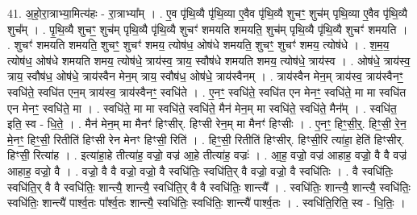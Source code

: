 \documentclass[17pt]{extarticle}
\begin{document}
41. अ॒हो॒रा॒त्राभ्या॒मित्य॑हः - रा॒त्राभ्या᳚म् । . ए॒व पृ॑थि॒व्यै पृ॑थि॒व्या ए॒वैव पृ॑थि॒व्यै शुचꣳ॒॒ शुच॑म् पृथि॒व्या ए॒वैव पृ॑थि॒व्यै शुच᳚म् । . पृ॒थि॒व्यै शुचꣳ॒॒ शुच॑म् पृथि॒व्यै पृ॑थि॒व्यै शुचꣳ॑ शमयति शमयति॒ शुच॑म् पृथि॒व्यै पृ॑थि॒व्यै शुचꣳ॑ शमयति । . शुचꣳ॑ शमयति शमयति॒ शुचꣳ॒॒ शुचꣳ॑ शमय॒ त्योष॑ध॒ ओष॑धे शमयति॒ शुचꣳ॒॒ शुचꣳ॑ शमय॒ त्योष॑धे । . श॒म॒य॒ त्योष॑ध॒ ओष॑धे शमयति शमय॒ त्योष॑धे॒ त्राय॑स्व॒ त्राय॒ स्वौष॑धे शमयति शमय॒ त्योष॑धे॒ त्राय॑स्व । . ओष॑धे॒ त्राय॑स्व॒ त्राय॒ स्वौष॑ध॒ ओष॑धे॒ त्राय॑स्वैन मेन॒म् त्राय॒ स्वौष॑ध॒ ओष॑धे॒ त्राय॑स्वैनम् । . त्राय॑स्वैन मेन॒म् त्राय॑स्व॒ त्राय॑स्वैनꣳ॒॒ स्वधि॑ते॒ स्वधि॑त एन॒म् त्राय॑स्व॒ त्राय॑स्वैनꣳ॒॒ स्वधि॑ते । . ए॒नꣳ॒॒ स्वधि॑ते॒ स्वधि॑त एन मेनꣳ॒॒ स्वधि॑ते॒ मा मा स्वधि॑त एन मेनꣳ॒॒ स्वधि॑ते॒ मा । . स्वधि॑ते॒ मा मा स्वधि॑ते॒ स्वधि॑ते॒ मैन॑ मेन॒म् मा स्वधि॑ते॒ स्वधि॑ते॒ मैन᳚म् । . स्वधि॑त॒ इति॒ स्व - धि॒ते॒ । . मैन॑ मेन॒म् मा मैनꣳ॑ हिꣳसीर्. हिꣳसी रेन॒म् मा मैनꣳ॑ हिꣳसीः । . ए॒नꣳ॒॒ हिꣳ॒॒सी॒र्॒. हिꣳ॒॒सी॒ रे॒न॒ मे॒नꣳ॒॒ हिꣳ॒॒सी॒ रितीति॑ हिꣳसी रेन मेनꣳ हिꣳसी॒ रिति॑ । . हिꣳ॒॒सी॒ रितीति॑ हिꣳसीर्. हिꣳसी॒रि त्या॑हा॒ हेति॑ हिꣳसीर्. हिꣳसी॒ रित्या॑ह । . इत्या॑हा॒हे तीत्या॑ह॒ वज्रो॒ वज्र॑ आ॒हे तीत्या॑ह॒ वज्रः॑ । . आ॒ह॒ वज्रो॒ वज्र॑ आहाह॒ वज्रो॒ वै वै वज्र॑ आहाह॒ वज्रो॒ वै । . वज्रो॒ वै वै वज्रो॒ वज्रो॒ वै स्वधि॑तिः॒ स्वधि॑ति॒र् वै वज्रो॒ वज्रो॒ वै स्वधि॑तिः । . वै स्वधि॑तिः॒ स्वधि॑ति॒र् वै वै स्वधि॑तिः॒ शान्त्यै॒ शान्त्यै॒ स्वधि॑ति॒र् वै वै स्वधि॑तिः॒ शान्त्यै᳚ । . स्वधि॑तिः॒ शान्त्यै॒ शान्त्यै॒ स्वधि॑तिः॒ स्वधि॑तिः॒ शान्त्यै॑ पार्श्व॒तः पा᳚र्श्व॒तः शान्त्यै॒ स्वधि॑तिः॒ स्वधि॑तिः॒ शान्त्यै॑ पार्श्व॒तः । . स्वधि॑ति॒रिति॒ स्व - धि॒तिः॒ । \newline
\pagebreak
{}
\end{document}
